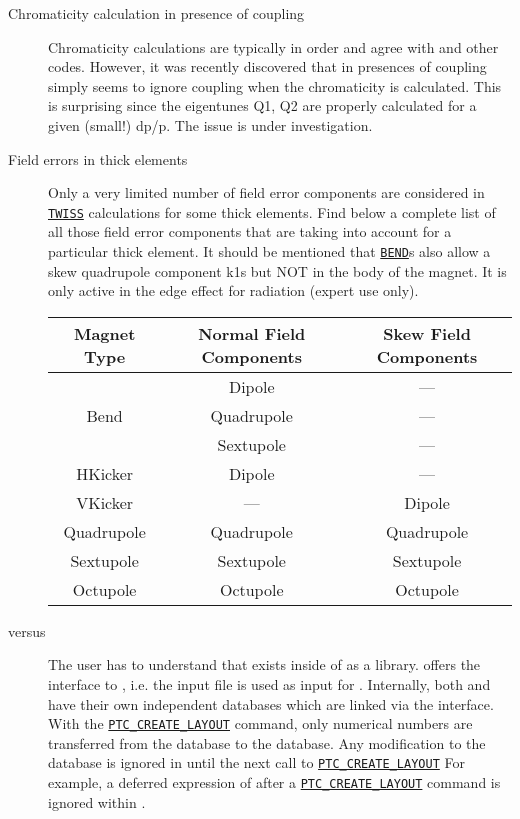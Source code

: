 \begin{description}
\item[Chromaticity calculation in presence of coupling] 
  Chromaticity calculations are typically in order and agree with \ptc
  and other codes. However, it was recently discovered that in
  presences of coupling \madx simply seems to ignore coupling when the
  chromaticity is calculated. This is surprising since the eigentunes
  Q1, Q2 are properly calculated for a given (small!) dp/p. The issue
  is under investigation.  


\item[Field errors in thick elements]
  Only a very limited number of field error components are
  considered in \hyperref[chap:twiss]{\tt TWISS} calculations for some
  thick elements. Find below 
  a complete list of all those field error components that
  are taking into account for a particular thick element. It
  should be mentioned that \hyperref[sec:bend]{\tt BEND}s also allow a
  skew quadrupole component k1s but NOT in the body of the magnet. It is
  only active in the edge effect for radiation (expert use only). 


{\renewcommand{\arraystretch}{2}
  \begin{tabular}{c | c | c}
    \hline 
    \textbf{Magnet Type} & \textbf{Normal Field Components} & \textbf{Skew Field Components} \\ 
    \hline
    & Dipole & ---\\
    Bend & Quadrupole & ---\\
    & Sextupole & ---\\
    \hline
    HKicker & Dipole & ---\\
    \hline
    VKicker & --- & Dipole\\
    \hline
    Quadrupole & Quadrupole & Quadrupole \\
    \hline
    Sextupole & Sextupole & Sextupole \\
    \hline
    Octupole & Octupole & Octupole \\
    \hline
  \end{tabular}
}

\item[\madx versus \ptc] 
  The user has to understand that \ptc exists inside of \madx as a
  library. \madx offers the interface to \ptc, i.e. the \madx input
  file is used as input for \ptc. Internally, both \ptc and \madx have
  their own independent databases which are linked via the
  interface. With the
  \hyperref[sec:ptc-create-layout]{\tt PTC\_CREATE\_LAYOUT}
  command, only numerical numbers are transferred from the \madx
  database to the \ptc database. Any modification to the \madx
  database is ignored in \ptc until the next call to
  \hyperref[sec:ptc-create-layout]{\tt PTC\_CREATE\_LAYOUT}
  For example, a deferred expression of \madx after a
  \hyperref[sec:ptc-create-layout]{\tt PTC\_CREATE\_LAYOUT}
  command is ignored within \ptc.  
  

\end{description}
